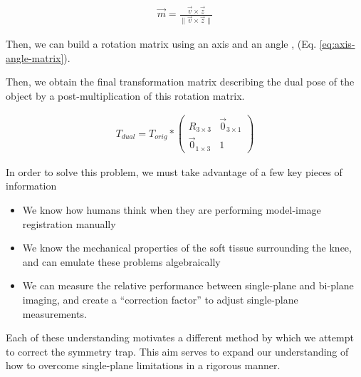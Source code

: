 \begin{equation}
    \begin{aligned}
        \vec{m} = \frac{\vec{v} \times \vec{z}}{\|\vec{v} \times \vec{z}\|}
    \end{aligned}
    \label{eq:perp-axis}
\end{equation}

Then, we can build a rotation matrix using an axis and an angle \cite{craneKinematicAnalysisRobot2008}, (Eq. \ref{eq:axis-angle-matrix}).

Then, we obtain the final transformation matrix describing the dual pose of the object by a post-multiplication of this rotation matrix.

\begin{equation}
    \begin{aligned}
        T_{dual} = T_{orig} * \begin{pmatrix}
            R_{3 \times 3} & \vec{0}_{3 \times 1} \\ \vec{0}_{1 \times 3} & 1
        \end{pmatrix}
    \end{aligned}
    \label{eq:rotation-matrix-mult}
\end{equation}


In order to solve this problem, we must take advantage of a few key pieces of information

\begin{itemize}
    \item We know how humans think when they are performing model-image registration manually
    \item We know the mechanical properties of the soft tissue surrounding the knee, and can emulate these problems algebraically
    \item We can measure the relative performance between single-plane and bi-plane imaging, and create a ``correction factor'' to adjust single-plane measurements.
\end{itemize}

Each of these understanding motivates a different method by which we attempt to correct the symmetry trap. This aim serves to expand our understanding of how to overcome single-plane limitations in a rigorous manner.

